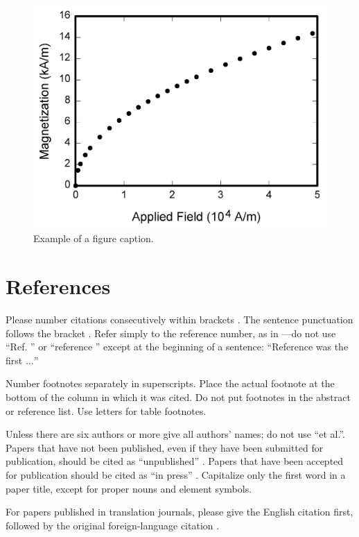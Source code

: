 \documentclass[conference]{IEEEtran}
\begin{document}
\begin{figure}[htbp]
	\centerline{\includegraphics{figures/fig1.png}}
	\caption{Example of a figure caption.}
	\label{fig}
\end{figure}

\section*{References}

Please number citations consecutively within brackets \cite{b1}. The 
sentence punctuation follows the bracket \cite{b2}. Refer simply to the reference 
number, as in \cite{b3}---do not use ``Ref. \cite{b3}'' or ``reference \cite{b3}'' except at 
the beginning of a sentence: ``Reference \cite{b3} was the first $\ldots$''

Number footnotes separately in superscripts. Place the actual footnote at 
the bottom of the column in which it was cited. Do not put footnotes in the 
abstract or reference list. Use letters for table footnotes.

Unless there are six authors or more give all authors' names; do not use 
``et al.''. Papers that have not been published, even if they have been 
submitted for publication, should be cited as ``unpublished'' \cite{b4}. Papers 
that have been accepted for publication should be cited as ``in press'' \cite{b5}. 
Capitalize only the first word in a paper title, except for proper nouns and 
element symbols.

For papers published in translation journals, please give the English 
citation first, followed by the original foreign-language citation \cite{b6}.
\end{document}
